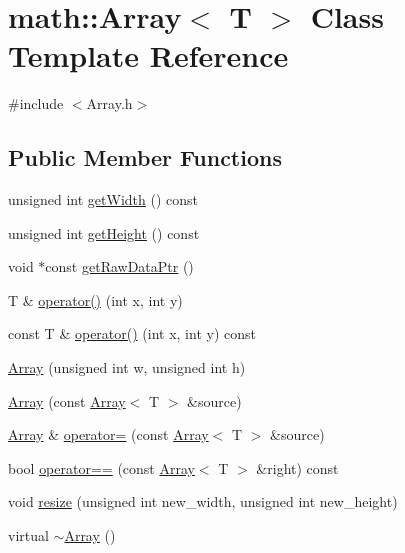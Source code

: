 \hypertarget{classmath_1_1_array}{}\section{math\+:\+:Array$<$ T $>$ Class Template Reference}
\label{classmath_1_1_array}


{\ttfamily \#include $<$Array.\+h$>$}

\subsection*{Public Member Functions}
\begin{DoxyCompactItemize}
\item 
unsigned int \hyperlink{classmath_1_1_array_aed1d255a072e2026f8fc7cb037d0697b}{get\+Width} () const
\item 
unsigned int \hyperlink{classmath_1_1_array_a2ebce27bf14e2c7ea83b5004e1a83bc5}{get\+Height} () const
\item 
void $\ast$const \hyperlink{classmath_1_1_array_ab2a61b31ce041823cc17220033b1fe1a}{get\+Raw\+Data\+Ptr} ()
\item 
T \& \hyperlink{classmath_1_1_array_a27f8eda2c4250a127826d697ebfb43ed}{operator()} (int x, int y)
\item 
const T \& \hyperlink{classmath_1_1_array_a24d7818828f26077fd029e48a87acc31}{operator()} (int x, int y) const
\item 
\hyperlink{classmath_1_1_array_abd2edb231282b3b43fcc3c7a91a59ca4}{Array} (unsigned int w, unsigned int h)
\item 
\hyperlink{classmath_1_1_array_aeff48bdf1a2cca8d2e338730a48cf79d}{Array} (const \hyperlink{classmath_1_1_array}{Array}$<$ T $>$ \&source)
\item 
\hyperlink{classmath_1_1_array}{Array} \& \hyperlink{classmath_1_1_array_a5b164d8a39d58bfee90b6f878f3ae007}{operator=} (const \hyperlink{classmath_1_1_array}{Array}$<$ T $>$ \&source)
\item 
bool \hyperlink{classmath_1_1_array_a78beecb014ee77b0dff47dbbb946c704}{operator==} (const \hyperlink{classmath_1_1_array}{Array}$<$ T $>$ \&right) const
\item 
void \hyperlink{classmath_1_1_array_a0a4294917127f526f4a98c460acd7918}{resize} (unsigned int new\+\_\+width, unsigned int new\+\_\+height)
\item 
virtual \hyperlink{classmath_1_1_array_a68c3eb186d34387d63908b78937d7aee}{$\sim$\+Array} ()
\end{DoxyCompactItemize}
